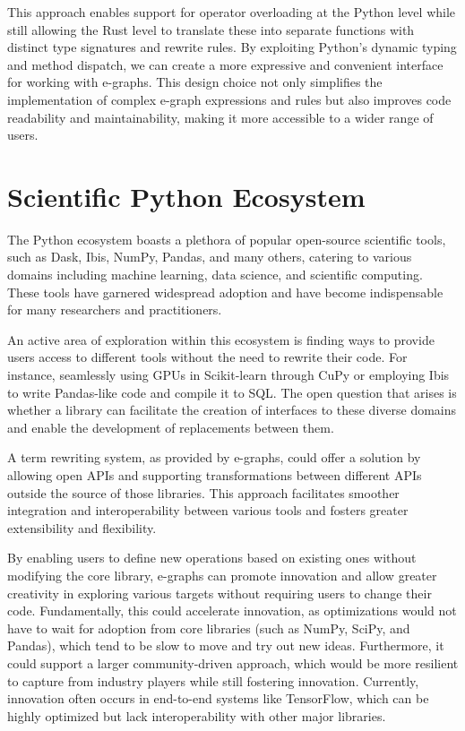 \documentclass[sigplan,screen,review]{acmart}
\begin{document}
This approach enables support for operator overloading at the Python level while still allowing the Rust level to translate these into separate functions with distinct type signatures and rewrite rules. By exploiting Python's dynamic typing and method dispatch, we can create a more expressive and convenient interface for working with e-graphs. This design choice not only simplifies the implementation of complex e-graph expressions and rules but also improves code readability and maintainability, making it more accessible to a wider range of users.


\section{Scientific Python Ecosystem}
The Python ecosystem boasts a plethora of popular open-source scientific tools, such as Dask, Ibis, NumPy, Pandas, and many others, catering to various domains including machine learning, data science, and scientific computing. These tools have garnered widespread adoption and have become indispensable for many researchers and practitioners.

An active area of exploration within this ecosystem is finding ways to provide users access to different tools without the need to rewrite their code. For instance, seamlessly using GPUs in Scikit-learn through CuPy or employing Ibis to write Pandas-like code and compile it to SQL. The open question that arises is whether a library can facilitate the creation of interfaces to these diverse domains and enable the development of replacements between them.

A term rewriting system, as provided by e-graphs, could offer a solution by allowing open APIs and supporting transformations between different APIs outside the source of those libraries. This approach facilitates smoother integration and interoperability between various tools and fosters greater extensibility and flexibility.

By enabling users to define new operations based on existing ones without modifying the core library, e-graphs can promote innovation and allow greater creativity in exploring various targets without requiring users to change their code. Fundamentally, this could accelerate innovation, as optimizations would not have to wait for adoption from core libraries (such as NumPy, SciPy, and Pandas), which tend to be slow to move and try out new ideas. Furthermore, it could support a larger community-driven approach, which would be more resilient to capture from industry players while still fostering innovation. Currently, innovation often occurs in end-to-end systems like TensorFlow, which can be highly optimized but lack interoperability with other major libraries.
\end{document}
